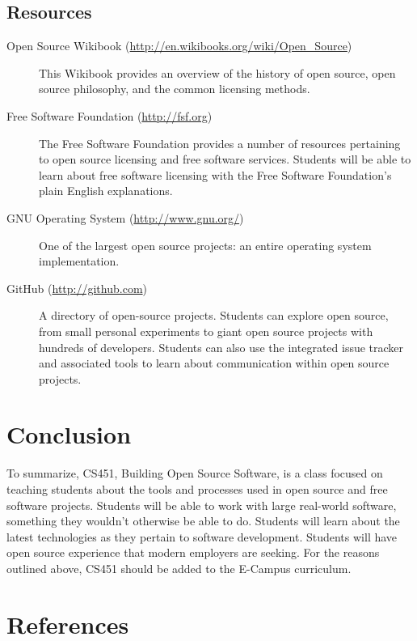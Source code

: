 \documentclass[12pt,letterpaper]{article}
\begin{document}
\subsection{Resources}
\begin{description}
  \item[Open Source Wikibook (\url{http://en.wikibooks.org/wiki/Open_Source})]
    This Wikibook provides an overview of the history of open source, open
    source philosophy, and the common licensing methods.
  \item[Free Software Foundation (\url{http://fsf.org})] The Free Software
    Foundation provides a number of resources pertaining to open source
    licensing and free software services.  Students will be able to learn about
    free software licensing with the Free Software Foundation's plain English
    explanations.
  \item[GNU Operating System (\url{http://www.gnu.org/})] One of the largest
    open source projects: an entire operating system implementation.
  \item[GitHub (\url{http://github.com})] A directory of open-source projects.
    Students can explore open source, from small personal experiments to giant
    open source projects with hundreds of developers.  Students can also use the
    integrated issue tracker and associated tools to learn about communication
    within open source projects.
\end{description}

\section{Conclusion}
To summarize, CS451, Building Open Source Software, is a class focused on
teaching students about the tools and processes used in open source and free
software projects.  Students will be able to work with large real-world
software, something they wouldn't otherwise be able to do.  Students will learn
about the latest technologies as they pertain to software development.  Students
will have open source experience that modern employers are seeking.  For the
reasons outlined above, CS451 should be added to the E-Campus curriculum.

\pagebreak

\section{References}
\end{document}
